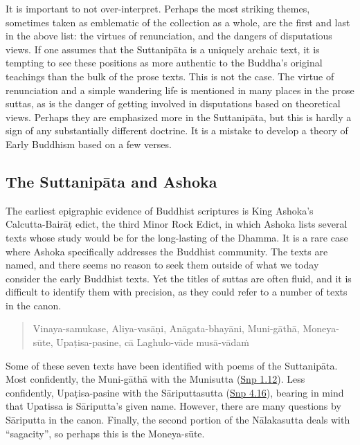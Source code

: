 \documentclass[12pt,openany]{book}%
\begin{document}
It is important to not over-interpret. Perhaps the most striking themes, sometimes taken as emblematic of the collection as a whole, are the first and last in the above list: the virtues of renunciation, and the dangers of disputatious views. If one assumes that the \textsanskrit{Suttanipāta} is a uniquely archaic text, it is tempting to see these positions as more authentic to the Buddha’s original teachings than the bulk of the prose texts. This is not the case. The virtue of renunciation and a simple wandering life is mentioned in many places in the prose suttas, as is the danger of getting involved in disputations based on theoretical views. Perhaps they are emphasized more in the \textsanskrit{Suttanipāta}, but this is hardly a sign of any substantially different doctrine. It is a mistake to develop a theory of Early Buddhism based on a few verses.

\subsection*{The \textsanskrit{Suttanipāta} and Ashoka}

The earliest epigraphic evidence of Buddhist scriptures is King Ashoka’s Calcutta-\textsanskrit{Bairāṭ} edict, the third Minor Rock Edict, in which Ashoka lists several texts whose study would be for the long-lasting of the Dhamma. It is a rare case where Ashoka specifically addresses the Buddhist community. The texts are named, and there seems no reason to seek them outside of what we today consider the early Buddhist texts. Yet the titles of suttas are often fluid, and it is difficult to identify them with precision, as they could refer to a number of texts in the canon.

\begin{quotation}%
Vinaya-samukase, Aliya-\textsanskrit{vasāṇi}, \textsanskrit{Anāgata}-\textsanskrit{bhayāni}, Muni-\textsanskrit{gāthā}, Moneya-\textsanskrit{sūte}, \textsanskrit{Upaṭisa}-pasine, \textsanskrit{cā} Laghulo-\textsanskrit{vāde} \textsanskrit{musā}-\textsanskrit{vādaṁ}

%
\end{quotation}

Some of these seven texts have been identified with poems of the \textsanskrit{Suttanipāta}. Most confidently, the Muni-\textsanskrit{gāthā} with the Munisutta (\href{https://suttacentral.net/snp1.12/en/sujato}{Snp 1.12}). Less confidently, \textsanskrit{Upaṭisa}-pasine with the \textsanskrit{Sāriputtasutta} (\href{https://suttacentral.net/snp4.16/en/sujato}{Snp 4.16}), bearing in mind that Upatissa is \textsanskrit{Sāriputta}’s given name. However, there are many questions by \textsanskrit{Sāriputta} in the canon. Finally, the second portion of the \textsanskrit{Nālakasutta} deals with “sagacity”, so perhaps this is the Moneya-\textsanskrit{sūte}.
\end{document}
